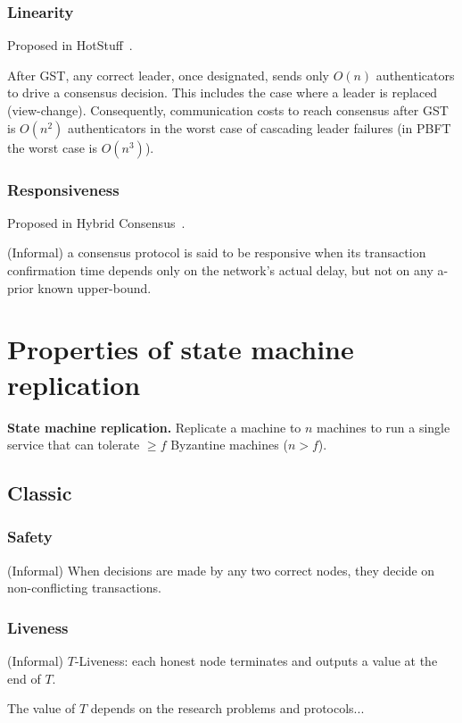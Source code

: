 \documentclass[runningheads]{llncs}
\begin{document}
\subsubsection{Linearity}
Proposed in HotStuff~\cite{yin2019hotstuff}.

After GST, any correct leader, once designated, sends only $O(n)$ authenticators to drive a consensus decision. This includes the case where a leader is replaced (view-change).
Consequently, communication costs to reach consensus after GST is $O(n^2)$ authenticators in the worst case of cascading leader failures (in PBFT the worst case is $O(n^3)$).


\subsubsection{Responsiveness}
Proposed in Hybrid Consensus~\cite{pass2017hybrid}.

(Informal) a consensus protocol is said to be responsive when its transaction confirmation time depends only on the network’s actual delay, but not on any a-prior known upper-bound.




\section{Properties of state machine replication}

\textbf{State machine replication.}
Replicate a machine to $n$ machines to run a single service that can tolerate $\geq f$ Byzantine machines ($n > f$).

\subsection{Classic}

\subsubsection{Safety}
(Informal) When decisions are made by any two correct nodes, they decide on non-conflicting transactions.

\subsubsection{Liveness}
(Informal) $T$-Liveness: each honest node terminates and outputs a value at the end of $T$.

The value of $T$ depends on the research problems and protocols...
\end{document}
